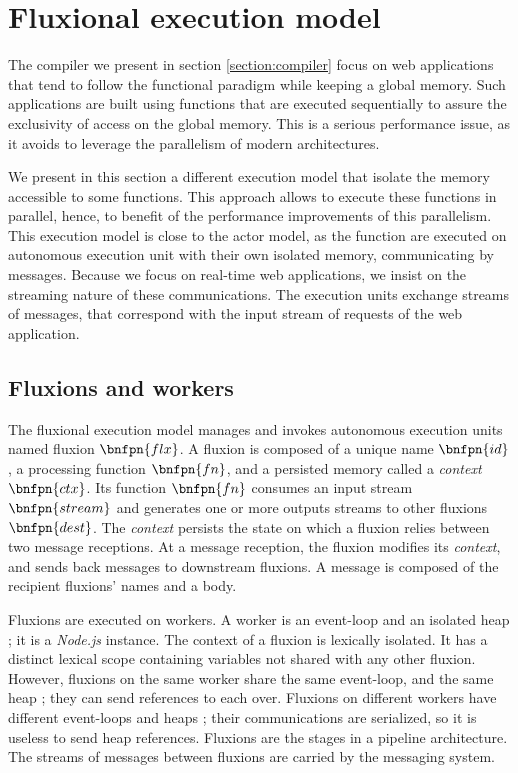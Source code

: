 \section{Fluxional execution model} \label{section:model}

The compiler we present in section \ref{section:compiler} focus on web applications that tend to follow the functional paradigm while keeping a global memory.
Such applications are built using functions that are executed sequentially to assure the exclusivity of access on the global memory.
This is a serious performance issue, as it avoids to leverage the parallelism of modern architectures.

We present in this section a different execution model that isolate the memory accessible to some functions.
This approach allows to execute these functions in parallel, hence, to benefit of the performance improvements of this parallelism.
This execution model is close to the actor model, as the function are executed on autonomous execution unit with their own isolated memory, communicating by messages.
Because we focus on real-time web applications, we insist on the streaming nature of these communications.
The execution units exchange streams of messages, that correspond with the input stream of requests of the web application.

\subsection{Fluxions and workers}

The fluxional execution model manages and invokes autonomous execution units named fluxion $\bnfpn{flx}$.
A fluxion is composed of a unique name $\bnfpn{id}$, a processing function $\bnfpn{fn}$, and a persisted memory called a \textit{context} $\bnfpn{ctx}$.
Its function $\bnfpn{fn}$ consumes an input stream $\bnfpn{stream}$ and generates one or more outputs streams to other fluxions $\bnfpn{dest}$.
The \textit{context} persists the state on which a fluxion relies between two message receptions.
At a message reception, the fluxion modifies its \textit{context}, and sends back messages to downstream fluxions.
A message is composed of the recipient fluxions' names and a body.

Fluxions are executed on workers.
A worker is an event-loop and an isolated heap ; it is a \textit{Node.js} instance.
The context of a fluxion is lexically isolated.
It has a distinct lexical scope containing variables not shared with any other fluxion.
However, fluxions on the same worker share the same event-loop, and the same heap ; they can send references to each over.
Fluxions on different workers have different event-loops and heaps ; their communications are serialized, so it is useless to send heap references.
Fluxions are the stages in a pipeline architecture.
The streams of messages between fluxions are carried by the messaging system.

